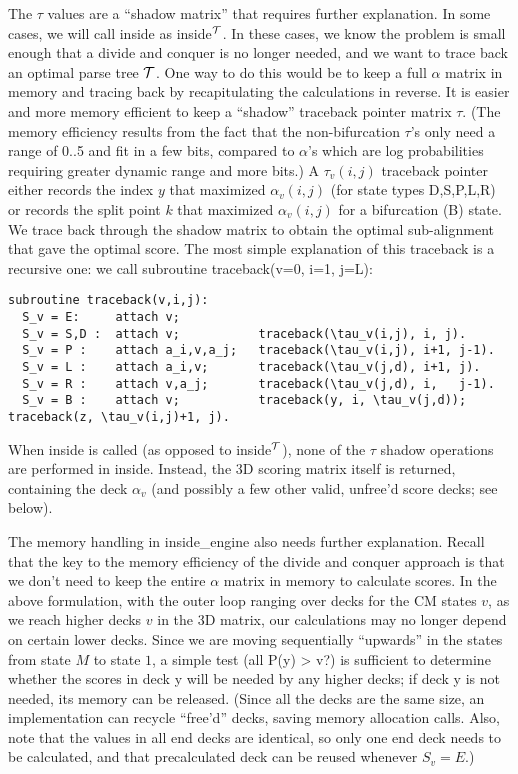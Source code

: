 \documentclass[11pt]{article}
\begin{document}
The $\tau$ values are a ``shadow matrix'' that requires further
explanation. In some cases, we will call inside as inside$^{\cal{T}}$.
In these cases, we know the problem is small enough that a divide and
conquer is no longer needed, and we want to trace back an optimal
parse tree $\cal{T}$. One way to do this would be to keep a full
$\alpha$ matrix in memory and tracing back by recapitulating the
calculations in reverse. It is easier and more memory efficient to
keep a ``shadow'' traceback pointer matrix $\tau$. (The memory
efficiency results from the fact that the non-bifurcation $\tau$'s
only need a range of 0..5 and fit in a few bits, compared to
$\alpha$'s which are log probabilities requiring greater dynamic range
and more bits.)  A $\tau_v(i,j)$ traceback pointer either records the
index $y$ that maximized $\alpha_v(i,j)$ (for state types D,S,P,L,R)
or records the split point $k$ that maximized $\alpha_v(i,j)$ for a
bifurcation (B) state. We trace back through the shadow matrix to
obtain the optimal sub-alignment that gave the optimal score. The most
simple explanation of this traceback is a recursive one: we call
subroutine traceback(v=0, i=1, j=L):

\begin{verbatim}
subroutine traceback(v,i,j):
  S_v = E:     attach v;
  S_v = S,D :  attach v;           traceback(\tau_v(i,j), i, j).
  S_v = P :    attach a_i,v,a_j;   traceback(\tau_v(i,j), i+1, j-1).
  S_v = L :    attach a_i,v;       traceback(\tau_v(j,d), i+1, j).
  S_v = R :    attach v,a_j;       traceback(\tau_v(j,d), i,   j-1).
  S_v = B :    attach v;           traceback(y, i, \tau_v(j,d));   traceback(z, \tau_v(i,j)+1, j).
\end{verbatim}

When inside is called (as opposed to inside$^{\cal{T}}$), none of the
$\tau$ shadow operations are performed in inside. Instead, the 3D
scoring matrix itself is returned, containing the deck $\alpha_v$ (and
possibly a few other valid, unfree'd score decks; see below).

The memory handling in inside\_engine also needs further explanation.
Recall that the key to the memory efficiency of the divide and conquer
approach is that we don't need to keep the entire $\alpha$ matrix in
memory to calculate scores. In the above formulation, with the outer
loop ranging over decks for the CM states $v$, as we reach higher
decks $v$ in the 3D matrix, our calculations may no longer depend on
certain lower decks. Since we are moving sequentially ``upwards'' in
the states from state $M$ to state $1$, a simple test (all P(y) >
v?)  is sufficient to determine whether the scores in deck y will be
needed by any higher decks; if deck y is not needed, its memory can be
released. (Since all the decks are the same size, an implementation
can recycle ``free'd'' decks, saving memory allocation calls. Also,
note that the values in all end decks are identical, so only one end
deck needs to be calculated, and that precalculated deck can be reused
whenever $S_v = E$.)
\end{document}
